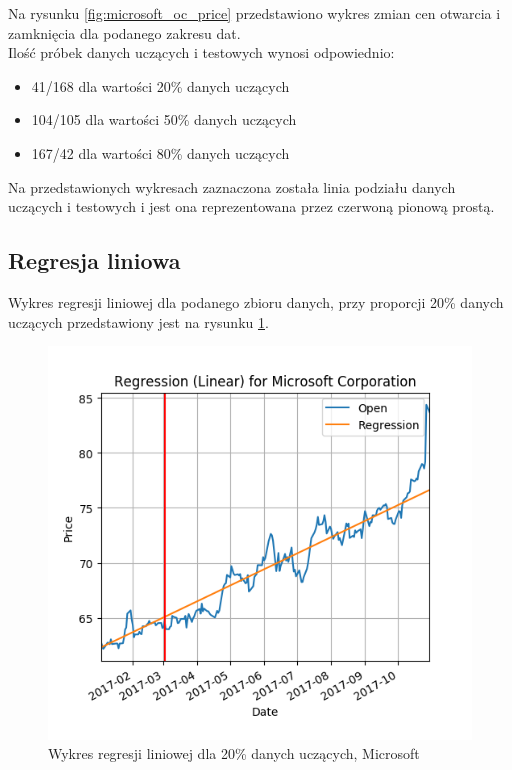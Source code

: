 Na rysunku \ref{fig:microsoft_oc_price} przedstawiono wykres zmian cen otwarcia i zamknięcia dla podanego zakresu dat.\\ 

Ilość próbek danych uczących i testowych wynosi odpowiednio:
\begin{itemize}
 \item 41/168 dla wartości 20\% danych uczących
 \item 104/105 dla wartości 50\% danych uczących
 \item 167/42 dla wartości 80\% danych uczących
\end{itemize}
Na przedstawionych wykresach zaznaczona została linia podziału danych uczących i testowych i jest ona reprezentowana przez czerwoną pionową prostą.

\subsection{Regresja liniowa}
Wykres regresji liniowej dla podanego zbioru danych, przy proporcji 20\% danych uczących przedstawiony jest na rysunku \ref{fig:microsoft_linear_20}.\\

\begin{figure}[h!]
\centering
\includegraphics[width=150mm]{pictures/plots/microsoft_linear_20.png}
\caption{Wykres regresji liniowej dla 20\% danych uczących, Microsoft}
\label{fig:microsoft_linear_20}
\end{figure}

